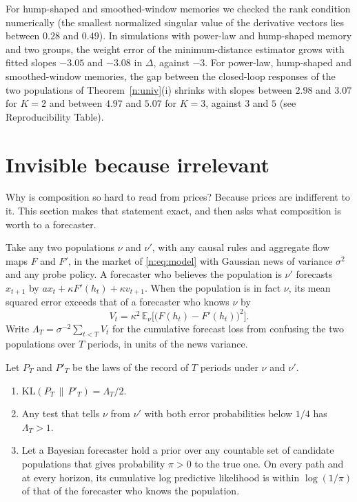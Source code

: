 For hump-shaped and smoothed-window memories we checked the rank condition numerically (the smallest normalized singular value of the derivative vectors lies between $0.28$ and $0.49$). In simulations with power-law and hump-shaped memory and two groups, the weight error of the minimum-distance estimator grows with fitted slopes $-3.05$ and $-3.08$ in $\Delta$, against $-3$. For power-law, hump-shaped and smoothed-window memories, the gap between the closed-loop responses of the two populations of Theorem~\ref{n:univ}(i) shrinks with slopes between $2.98$ and $3.07$ for $K=2$ and between $4.97$ and $5.07$ for $K=3$, against $3$ and $5$ (see Reproducibility Table).

\section{Invisible because irrelevant}\label{n:irr_sec}

Why is composition so hard to read from prices? Because prices are indifferent to it. This section makes that statement exact, and then asks what composition is worth to a forecaster.

Take any two populations $\nu$ and $\nu'$, with any causal rules and aggregate flow maps $F$ and $F'$, in the market of \eqref{n:eq:model} with Gaussian news of variance $\sigma^2$ and any probe policy. A forecaster who believes the population is $\nu'$ forecasts $x_{t+1}$ by $ax_t+\kappa F'(h_t)+\kappa v_{t+1}$. When the population is in fact $\nu$, its mean squared error exceeds that of a forecaster who knows $\nu$ by
\[
V_t=\kappa^2\,\mathbb E_\nu\big[\big(F(h_t)-F'(h_t)\big)^2\big].
\]
Write $\Lambda_T=\sigma^{-2}\sum_{t<T}V_t$ for the cumulative forecast loss from confusing the two populations over $T$ periods, in units of the news variance.

\begin{theorem}\label{n:dual}
Let $P_T$ and $P'_T$ be the laws of the record of $T$ periods under $\nu$ and $\nu'$.
\begin{enumerate}[label=(\roman*),itemsep=1pt]
\item $\mathrm{KL}(P_T\,\|\,P'_T)=\Lambda_T/2$.
\item Any test that tells $\nu$ from $\nu'$ with both error probabilities below $1/4$ has $\Lambda_T>1$.
\item Let a Bayesian forecaster hold a prior over any countable set of candidate populations that gives probability $\pi>0$ to the true one. On every path and at every horizon, its cumulative log predictive likelihood is within $\log(1/\pi)$ of that of the forecaster who knows the population.
\end{enumerate}
\end{theorem}

